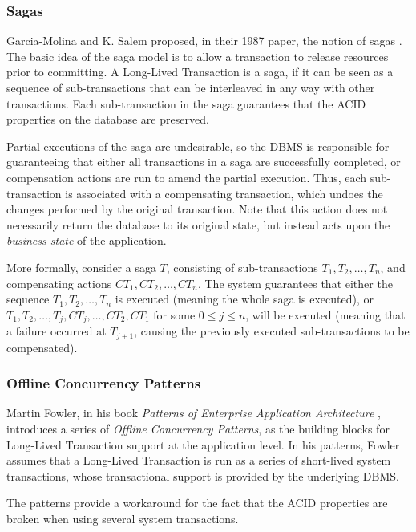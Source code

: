 \documentclass{llncs}
\begin{document}
\subsubsection{Sagas}
\label{sec:sagas}

Garcia-Molina and K. Salem proposed, in their 1987 paper, the notion
of sagas \cite{garcia1987sagas}. The basic idea of the saga model is
to allow a transaction to release resources prior to committing. A
Long-Lived Transaction is a saga, if it can be seen as a sequence of
sub-transactions that can be interleaved in any way with other
transactions. Each sub-transaction in the saga guarantees that the
ACID properties on the database are preserved.

Partial executions of the saga are undesirable, so the DBMS is
responsible for guaranteeing that either all transactions in a saga
are successfully completed, or compensation actions are run to amend
the partial execution. Thus, each sub-transaction is associated with a
compensating transaction, which undoes the changes performed by the
original transaction. Note that this action does not necessarily
return the database to its original state, but instead acts upon the
{\it business state} of the application.

More formally, consider a saga $T$, consisting of sub-transactions
$T_1, T_2, \ldots, T_n$, and compensating actions $CT_1, CT_2, \ldots,
CT_n$. The system guarantees that either the sequence $T_1, T_2,
\ldots, T_n$ is executed (meaning the whole saga is executed), or
$T_1, T_2, \ldots, T_j,CT_j, \ldots, CT_2, CT_1$ for some $0 \le j \le
n$, will be executed (meaning that a failure occurred at $T_{j+1}$,
causing the previously executed sub-transactions to be compensated).

\subsubsection{Offline Concurrency Patterns}

Martin Fowler, in his book {\it Patterns of Enterprise Application
  Architecture} \cite{fowler2003patterns}, introduces a series of {\it
  Offline Concurrency Patterns}, as the building blocks for Long-Lived
Transaction support at the application level. In his patterns, Fowler
assumes that a Long-Lived Transaction is run as a series of
short-lived system transactions, whose transactional support is
provided by the underlying DBMS.

The patterns provide a workaround for the fact that the ACID
properties are broken when using several system transactions.
\end{document}
